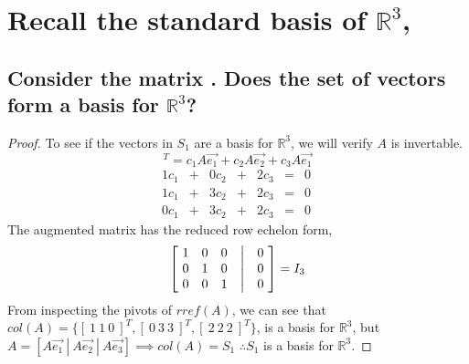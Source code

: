 \documentclass[../main.tex]{subfiles}
\begin{document}
\section{Recall the standard basis of
  $\mathbb{R}^3$, }
\subsection[Consider the matrix $A$ Does the set of vectors \DS{\{ A\vec{e_1},A\vec{e_2},A\vec{e_3} \}} form a basis for $\mathbb{R}^3$]
{Consider the matrix . Does the set of vectors  form a basis for $\mathbb{R}^3$?
}
\begin{proof}
  To see if the vectors in $S_{1}$ are a basis for $\mathbb{R}^3$, we will verify $A$ is invertable.
  \begin{equation*}
    [0\ 0\ 0]^{T} = c_{1}A\vec{e_1} + c_{2}A\vec{e_2} + c_{3}A\vec{e_1}
  \end{equation*}
  $$
    \begin{matrix}
      1c_{1} & + & 0c_{2} & + & 2c_{3} & = & 0 \ \\
      1c_{1} & + & 3c_{2} & + & 2c_{3} & = & 0 \ \\
      0c_{1} & + & 3c_{2} & + & 2c_{3} & = & 0 \
    \end{matrix}
  $$
  The augmented matrix has the reduced row echelon form,
  \begin{align*}
    \begin{bmatrix}
      \ 1 & 0 & 0 & \bigm| & 0\ \\
      \ 0 & 1 & 0 & \bigm| & 0\ \\
      \ 0 & 0 & 1 & \bigm| & 0\
    \end{bmatrix} = I_{3}
  \end{align*}
  From inspecting the pivots of $rref(A)$, we can see that $col(A) = \{[\ 1\ 1 \ 0\ ]^T, [\ 0\ 3\ 3\ ]^T, [\ 2\ 2\ 2\ ]^T \}$, is a basis for $\mathbb{R}^3$, but
  $A = [ A\vec{e_1} \ | \ A\vec{e_2}\ |\ A\vec{e_3}]\implies col(A) = S_1$
  $\therefore {S_{1}}$ is a basis for $\mathbb{R}^3$.
\end{proof}
\end{document}
